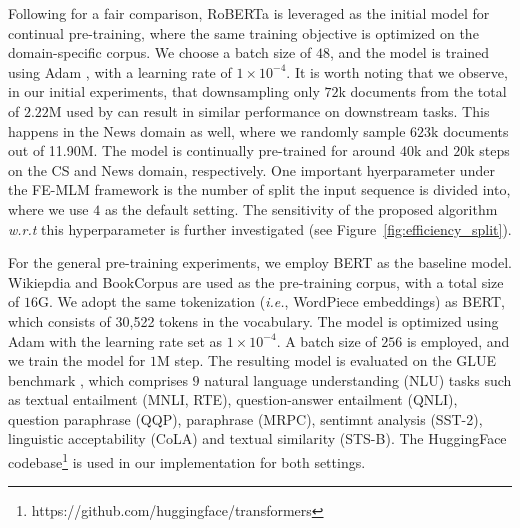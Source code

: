 \documentclass{article} \usepackage{iclr2021_conference,times}
\theoremstyle{plain}
\begin{document}
Following \citep{gururangan2020don} for a fair comparison, RoBERTa \cite{liu2019roberta} is leveraged as the initial model for continual pre-training, where the same training objective is optimized on the domain-specific corpus. We choose a batch size of $48$, and the model is trained using Adam \cite{kingma2014adam}, with a learning rate of $1 \times 10^{-4}$. It is worth noting that we observe, in our initial experiments, that downsampling only $72$k documents from the total of $2.22$M used by \cite{gururangan2020don} can result in similar performance on downstream tasks. This happens in the News domain as well, where we randomly sample $623$k documents out of 11.90M. The model is continually pre-trained for around $40$k and $20$k steps on the CS and News domain, respectively. One important hyerparameter under the FE-MLM framework is the number of split the input sequence is divided into, where we use $4$ as the default setting. The sensitivity of the proposed algorithm \emph{w.r.t} this hyperparameter is further investigated (see Figure~\ref{fig:efficiency_split}).

For the general pre-training experiments, we employ BERT as the baseline model. Wikiepdia and BookCorpus \citep{zhu2015aligning} are used as the pre-training corpus, with a total size of $16$G. We adopt the same tokenization (\emph{i.e.}, WordPiece embeddings) as BERT, which consists of 30,522 tokens in the vocabulary. The model is optimized using Adam with the learning rate set as $1 \times 10^{-4}$. A batch size of $256$ is employed, and we train the model for $1$M step. 
The resulting model is evaluated on the GLUE benchmark \citep{wang2018glue}, which comprises $9$ natural language understanding (NLU) tasks such as textual entailment (MNLI, RTE), question-answer entailment (QNLI), question paraphrase (QQP), paraphrase (MRPC), sentimnt analysis (SST-2), linguistic acceptability (CoLA) and textual similarity (STS-B). The HuggingFace codebase\footnote{https://github.com/huggingface/transformers} is used in our implementation for both settings.
\end{document}
